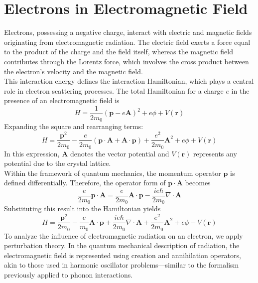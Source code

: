 \section{Electrons in Electromagnetic Field}
Electrons, possessing a negative charge, interact with electric and magnetic fields originating from electromagnetic radiation. The electric field exerts a force equal to the product of the charge and the field itself, whereas the magnetic field contributes through the Lorentz force, which involves the cross product between the electron's velocity and the magnetic field.\\
This interaction energy defines the interaction Hamiltonian, which plays a central role in electron scattering processes. The total Hamiltonian for a charge \( e \) in the presence of an electromagnetic field is
\begin{equation}
	H = \frac{1}{2m_0} (\mathbf{p} - e \mathbf{A})^2 + e \phi + V(\mathbf{r})
\end{equation}
Expanding the square and rearranging terms:
\begin{equation}
	H = \frac{\mathbf{p}^2}{2m_0} - \frac{e}{2m_0} (\mathbf{p} \cdot \mathbf{A} + \mathbf{A} \cdot \mathbf{p}) + \frac{e^2}{2m_0} \mathbf{A}^2 + e \phi + V(\mathbf{r})
\end{equation}
In this expression, \( \mathbf{A} \) denotes the vector potential and \( V(\mathbf{r}) \) represents any potential due to the crystal lattice.\\
Within the framework of quantum mechanics, the momentum operator \( \mathbf{p} \) is defined differentially. Therefore, the operator form of \( \mathbf{p} \cdot \mathbf{A} \) becomes
\begin{equation}
	\frac{e}{2m_0} \mathbf{p} \cdot \mathbf{A} = \frac{e}{2m_0} \mathbf{A} \cdot \mathbf{p} - \frac{i e \hbar}{2m_0} \nabla \cdot \mathbf{A}
\end{equation}
Substituting this result into the Hamiltonian yields
\begin{equation}
	H = \frac{\mathbf{p}^2}{2m_0} - \frac{e}{m_0} \mathbf{A} \cdot \mathbf{p} + \frac{i e \hbar}{2m_0} \nabla \cdot \mathbf{A} + \frac{e^2}{2m_0} \mathbf{A}^2 + e \phi + V(\mathbf{r})
\end{equation}
To analyze the influence of electromagnetic radiation on an electron, we apply perturbation theory. In the quantum mechanical description of radiation, the electromagnetic field is represented using creation and annihilation operators, akin to those used in harmonic oscillator problems—similar to the formalism previously applied to phonon interactions.\\
